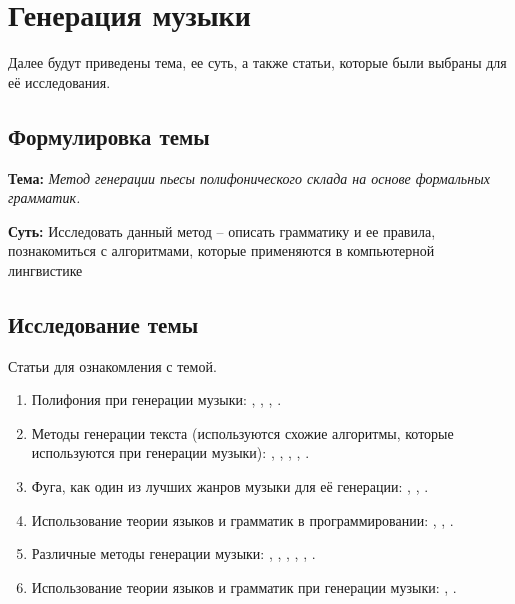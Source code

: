 \chapter{Генерация музыки}

Далее будут приведены тема, ее суть, а также статьи, которые были выбраны для её исследования.

\section{Формулировка темы}

\textbf{Тема:} \textit{Метод генерации пьесы полифонического склада на основе формальных грамматик.}

\textbf{Суть:} Исследовать данный метод -- описать грамматику и ее правила, познакомиться с алгоритмами, которые применяются в компьютерной лингвистике

\section{Исследование темы}

Статьи для ознакомления с темой.

\begin{enumerate}
    \item Полифония при генерации музыки: \cite{1-polyphonic}, \cite{2-polyphonic}, \cite{3-polyphonic}, \cite{4-polyphonic}.
    \item Методы генерации текста (используются схожие алгоритмы, которые используются при генерации музыки): \cite{1-text}, \cite{2-text}, \cite{3-text}, \cite{4-text}, \cite{5-text}.
    \item Фуга, как один из лучших жанров музыки для её генерации: \cite{1-fugue}, \cite{2-fugue}, \cite{3-fugue}.
    \item Использование теории языков и грамматик в программировании: \cite{1-grammar}, \cite{2-grammar}, \cite{3-grammar}.
    \item Различные методы генерации музыки: \cite{1-music}, \cite{2-music}, \cite{3-music}, \cite{4-music}, \cite{5-music}, \cite{6-music}.
    \item Использование теории языков и грамматик при генерации музыки: \cite{1-grammusic}, \cite{2-grammusic}.
\end{enumerate}